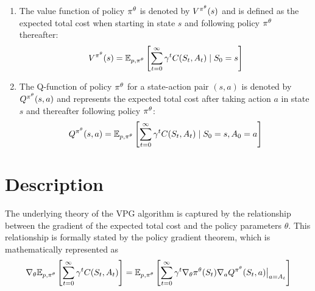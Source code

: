 \documentclass[12pt,twoside]{../../mitthesis}
\begin{document}
\begin{enumerate}
    \item The value function of policy $\policy^{\theta}$ is denoted by $V^{\policy^{\theta}}(s)$ and is defined as the expected total cost when starting in state $s$ and following policy $\policy^{\theta}$ thereafter:
    $$
    \Value^{\policy^{\theta}}(\state) =  \E[\transit, \policy^{\theta}]{\sum_{t = 0}^{\infty} \gamma ^ t \Cost(\State_{t}, \Action_{t}) \mid \State_0 = \state}
    $$ 
    \item The Q-function of policy $\policy^{\theta}$ for a state-action pair $(s, a)$ is denoted by $Q^{\policy^{\theta}}(s, a)$ and represents the expected total cost after taking action $a$ in state $s$ and thereafter following policy $\policy^{\theta}$: 
    $$
    Q^{\policy^{\theta}}(\state, \action) = \E[\transit, \policy^{\theta}]{\sum_{t = 0}^{\infty} \gamma ^ t \Cost(\State_{t}, \Action_{t}) \mid \State_0 = \state, \Action_0 = \action}
    $$
\end{enumerate}

\section*{Description}
The underlying theory of the VPG algorithm is captured by the relationship between the gradient of the expected total cost and the policy parameters $\theta$. 
This relationship is formally stated by the policy gradient theorem, which is mathematically represented as
\begin{equation}
    \label{eqn_ddpg_grad}
    \nabla_{\theta} \E[\transit, \policy^{\theta}]{\sum_{t = 0}^{\infty} \gamma ^ t \Cost(\State_{t}, \Action_{t})} = 
    \E[\transit, \policy^{\theta}]{\sum_{t=0}^{\infty}\gamma^t\nabla_{\theta}\policy^{\theta}(\State_t)\nabla_{\action} Q^{\policy^{\theta}}(\State_t, \action)\big\rvert_{\action = \Action_t}}
\end{equation}
\end{document}
